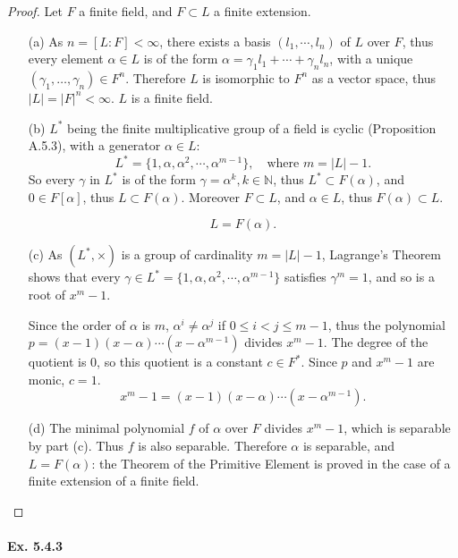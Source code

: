 \documentclass[11pt,a4paper]{article}
\begin{document}
\begin{proof}
Let $F$ a finite field, and $F\subset L$ a finite extension.
\begin{enumerate}
\item[(a)]
As $n = [L:F]<\infty$, there exists a basis $(l_1,\cdots,l_n)$ of $L$  over $F$, thus every element $\alpha \in L$ is of the form $\alpha = \gamma_1 l_1+\cdots +\gamma_n l_n$,  with a unique $(\gamma_1,\ldots,\gamma_n) \in F^n$. Therefore $L$ is isomorphic to $F^n$ as a vector space, thus $\vert L \vert = \vert F \vert^n <\infty$. $L$ is a finite field.

\item[(b)] $L^*$ being the finite multiplicative group of a field is cyclic (Proposition A.5.3), with a generator $\alpha \in L$: 
$$L^* = \{1,\alpha,\alpha^2,\cdots,\alpha^{m-1}\},\quad  \text{where } m = |L|-1.$$
So every $\gamma$ in $L^*$ is of the form $\gamma = \alpha^k, k\in \mathbb{N}$, thus $L^* \subset F(\alpha)$, and $0 \in F[\alpha]$, thus $L \subset F(\alpha)$. Moreover $F\subset L$, and $\alpha \in L$, thus $F(\alpha) \subset L$.

$$L = F(\alpha).$$ 

\item[(c)]
As $(L^*,\times)$ is a group of cardinality $m = \vert L \vert - 1$, Lagrange's Theorem shows that every $\gamma  \in L^* = \{1,\alpha,\alpha^2,\cdots,\alpha^{m-1}\}$ satisfies $\gamma^m =1$, and so is a root of $x^m-1$.

Since the order of $\alpha$ is $m$,  $\alpha^i \neq \alpha^j$ if $0 \leq i <j \leq m-1$, thus  the polynomial $p =  (x-1)(x-\alpha)\cdots(x-\alpha^{m-1})$ divides $x^m-1$. The degree of the quotient is 0, so this quotient is a constant $c\in F^*$. Since  $p$ and $x^m-1$ are monic, $c=1$.
$$x^m - 1 = (x-1)(x-\alpha)\cdots(x-\alpha^{m-1}).$$

\item[(d)]
The minimal polynomial $f$ of $\alpha$ over $F$ divides  $x^m-1$, which is separable by part (c). Thus $f$ is also separable. Therefore $\alpha$ is separable, and $L = F(\alpha)$: the Theorem of the Primitive Element is proved in the case of a finite extension of a finite field.

\end{enumerate}
\end{proof}

\paragraph{Ex. 5.4.3}
\end{document}
